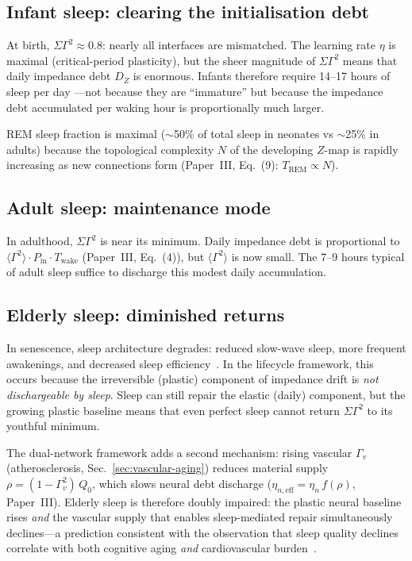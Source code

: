 ﻿\documentclass[aps,pre,twocolumn,superscriptaddress,floatfix]{revtex4-2}
\begin{document}
\subsection{Infant sleep: clearing the initialisation debt}

At birth, $\Sigma\Gamma^2 \approx 0.8$:
nearly all interfaces are mismatched.
The learning rate $\eta$ is maximal
(critical-period plasticity),
but the sheer magnitude of $\Sigma\Gamma^2$
means that daily impedance debt $D_Z$ is enormous.
Infants therefore require 14--17 hours of sleep per day
---not because they are ``immature'' but because the
impedance debt accumulated per waking hour is
proportionally much larger.

REM sleep fraction is maximal ($\sim$50\% of total sleep
in neonates vs $\sim$25\% in adults) because the
topological complexity $N$ of the developing $Z$-map
is rapidly increasing as new connections form
(Paper~III, Eq.~(9): $T_{\mathrm{REM}} \propto N$).

\subsection{Adult sleep: maintenance mode}

In adulthood, $\Sigma\Gamma^2$ is near its minimum.
Daily impedance debt is proportional to
$\langle\Gamma^2\rangle \cdot P_{\mathrm{in}} \cdot
T_{\mathrm{wake}}$ (Paper~III, Eq.~(4)),
but $\langle\Gamma^2\rangle$ is now small.
The 7--9 hours typical of adult sleep suffice to
discharge this modest daily accumulation.

\subsection{Elderly sleep: diminished returns}

In senescence, sleep architecture degrades:
reduced slow-wave sleep, more frequent awakenings,
and decreased sleep efficiency~\cite{Ohayon2004}.
In the lifecycle framework, this occurs because
the irreversible (plastic) component of impedance
drift is \emph{not dischargeable by sleep}.
Sleep can still repair the elastic (daily) component,
but the growing plastic baseline means that even
perfect sleep cannot return $\Sigma\Gamma^2$ to
its youthful minimum.

The dual-network framework adds a second mechanism:
rising vascular $\Gamma_v$ (atherosclerosis,
Sec.~\ref{sec:vascular-aging}) reduces material supply
$\rho = (1-\Gamma_v^2)\,Q_0$, which slows neural
debt discharge ($\eta_{n,\mathrm{eff}} = \eta_n\,f(\rho)$,
Paper~III).
Elderly sleep is therefore doubly impaired:
the plastic neural baseline rises \emph{and}
the vascular supply that enables sleep-mediated repair
simultaneously declines---a prediction consistent with
the observation that sleep quality declines
correlate with both cognitive aging \emph{and}
cardiovascular burden~\cite{Mander2017}.
\end{document}
